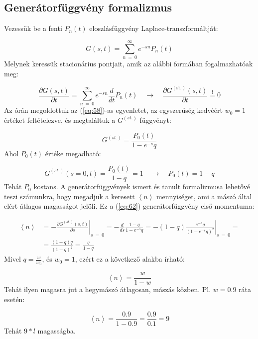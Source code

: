 \subsection{Generátorfüggvény formalizmus}
Vezessük be a fenti $P_{n} \left( t \right)$ eloszlásfüggvény Laplace-transzformáltját:

\begin{equation} \label{eq:60}
    G \left( s, t \right)
    =
    \sum_{n\ =\ 0}^{\infty} e^{-sn} P_{n} \left( t \right)
\end{equation}
Melynek keressük stacionárius pontjait, amik az alábbi formában fogalmazhatóak meg:

\begin{equation} \label{eq:61}
    \frac{\partial G \left( s, t \right)}{\partial t}
    =
    \sum_{n\ =\ 0}^{\infty} e^{-sn} \frac{d}{dt} P_{n} \left( t \right)
    \quad \to \quad
    \frac{\partial G^{\left( \text{st.} \right)} \left( s, t \right)}{\partial t}
    \overset{!}{=}
    0
\end{equation}
Az órán megoldottuk az (\ref{eq:58})-as egyenletet, az egyszerűség kedvéért $w_{0} = 1$ értéket feltételezve, és megtaláltuk a $G^{\left( st. \right)}$ függvényt:

\begin{equation} \label{eq:62}
    G^{\left( st. \right)}
    =
    \frac{P_{0} \left( t \right)}{1 - e^{-s} q}
\end{equation}
Ahol $P_{0} \left( t \right)$ értéke megadható:

\begin{equation}
    G^{\left( st. \right)} \left( s = 0, t \right)
    =
    \frac{P_{0} \left( t \right)}{1 - q}
    =
    1
    \quad \to \quad
    P_{0} \left( t \right)
    =
    1 - q
\end{equation}
Tehát $P_{0}$ kostans. A generátorfüggvények ismert és tanult formalizmusa lehetővé teszi számunkra, hogy megadjuk a keresett $\left< n \right>$ mennyiséget, ami a mászó által elért átlagos magasságot jelöli. Ez a (\ref{eq:62}) generátorfüggvény első momentuma:

\begin{align}
    \left< n \right>
    &=
    - \left. \frac{\partial G^{\left( st. \right)} \left( s,t \right)}{\partial s} \right\rvert_{s\ =\ 0}
    =
    - \frac{d}{d s} \frac{1 - q}{1 - e^{-s} q}
    =
    - \left. (1 - q) \frac{e^{-s} q}{\left( 1 - e^{-s} q \right)^{2}}\right\rvert_{s\ =\ 0}
    = \nonumber \\
    &=
    \frac{\left( 1 - q \right) q}{\left( 1 - q \right)^{2}}
    =
    \frac{q}{1 - q}
\end{align}
Mivel $q = \frac{w}{w_{0}}$, és $w_{0} = 1$, ezért ez a következő alakba írható:

\begin{equation}
    \boxed{
    \left< n \right>
    =
    \frac{w}{1 - w}
    }
\end{equation}
Tehát ilyen magasra jut a hegymászó átlagosan, mászás közben. Pl. $w = 0.9$ ráta esetén:

\begin{equation}
    \left< n \right>
    =
    \frac{0.9}{1 - 0.9}
    =
    \frac{0.9}{0.1}
    =
    9
\end{equation}
Tehát $9 * l$ magasságba.
